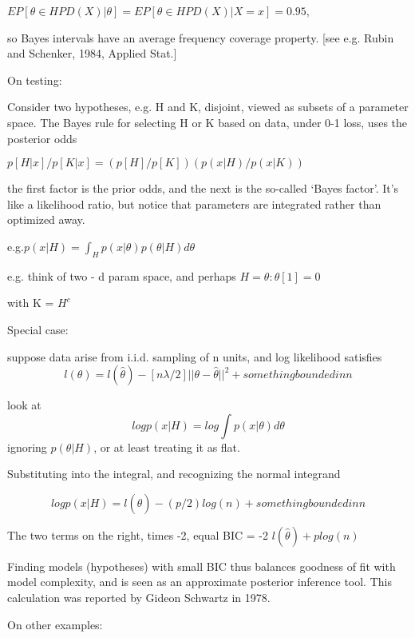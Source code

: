 \documentclass[11pt,a4paper]{article}
\begin{document}
	$E{  P[ \theta \in HPD(X) | \theta ] } = E{ P[ \theta \in HPD(X) | X=x ] } = 0.95$, 
	
	so Bayes intervals have an average frequency coverage property.  [see e.g. Rubin and Schenker, 1984, Applied Stat.]
	
	On testing:
	
	Consider two hypotheses, e.g. H and K, disjoint, viewed as subsets of a parameter space. The Bayes rule for selecting H or K based on data, under 0-1 loss, uses the posterior odds
	
	$p[H|x]/p[K|x] = (  p[H]/p[K] )  ( p(x|H) / p(x|K) )$
	
	the first factor is the prior odds, and the next is the so-called `Bayes factor'.  It's like a likelihood ratio, but notice that parameters are integrated rather than optimized away.
	
	e.g.$ p(x|H) = \int_H p(x|\theta) p(\theta|H) d\theta$
	
	e.g. think of two - d param space, and perhaps $H = { \theta: \theta[1] = 0 }$
	
	with K = $H^c$
	
	Special case:
	
	suppose data arise from i.i.d. sampling of n units, and log likelihood satisfies
	\begin{equation}
		l(\theta) = l(\hat{\theta}) - [n \lambda/2] || \theta - \hat{\theta} ||^2 + something bounded in n
	\end{equation}

	
	look at 
	\begin{equation}
	log p(x|H) = log \int p(x|\theta)  d\theta
	\end{equation}
    ignoring $p(\theta|H)$, or at least treating it as flat.
    
    Substituting into the integral, and recognizing the normal integrand
	
	\begin{equation}
		log p(x|H) = l(\hat{\theta}) - (p/2) log(n) + something bounded in n
	\end{equation}

	
	The two terms on the right, times -2, equal BIC = -2 $l(\hat{\theta}) + p log(n)$
	
	Finding models (hypotheses) with small BIC thus balances goodness of fit with model complexity, and is seen  as an approximate posterior inference tool.  This calculation was reported by Gideon Schwartz in 1978.
	
	On other examples:
	
\end{document}
